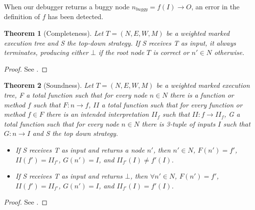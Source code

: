\begin{definition}
When our debugger returns a buggy node \(n_{buggy} = f(I) \to O\), an error in the definition of \(f\) has been detected. 

\end{definition}
\newtheorem{theorem}{Theorem}
\begin{theorem}[Completeness]
Let \(T = (N,E,W,M)\) be a weighted marked execution tree and S the top-down strategy.
If S receives T as input, it always terminates, producing either \(\bot\) if the root node \(T\) is correct  or \(n'\in N\) otherwise.
\end{theorem}
\begin{proof}
See \cite{DeclarativeErrorDiagnosis}.
\end{proof}
\begin{theorem}[Soundness]
Let \(T = (N,E,W,M)\) be a weighted marked execution tree, F a total function such that for every node \(n\in N\) there is a function or method \(f\) such that \(F:n\to f\), \(\mathit{II}\) a total function such that for every function or method \(f\in F\) there is an intended interpretation \(II_f\) such that \(\mathit{II}:f\to II_f\), G a total function such that for every node \(n\in N\) there is 3-tuple of inputs \(I\) such that \(G:n\to I\) and S the top down strategy.
\begin{itemize}
    \item If S receives T as input and returns a node \(n'\), then \(n'\in N\), \(F(n') = f'\), \(\mathit{II}(f') = II_{f'}\), \(G(n') = I\), and \(II_{f'}(I)\neq f'(I)\).
    \item If S receives T as input and returns \(\bot\), then \(\forall n'\in N\), \(F(n') = f'\), \(\mathit{II}(f') = II_{f'}\), \(G(n') = I\), and \(II_{f'}(I) = f'(I)\).
\end{itemize}
\end{theorem}
\begin{proof}
See \cite{DeclarativeErrorDiagnosis}.
\end{proof}

